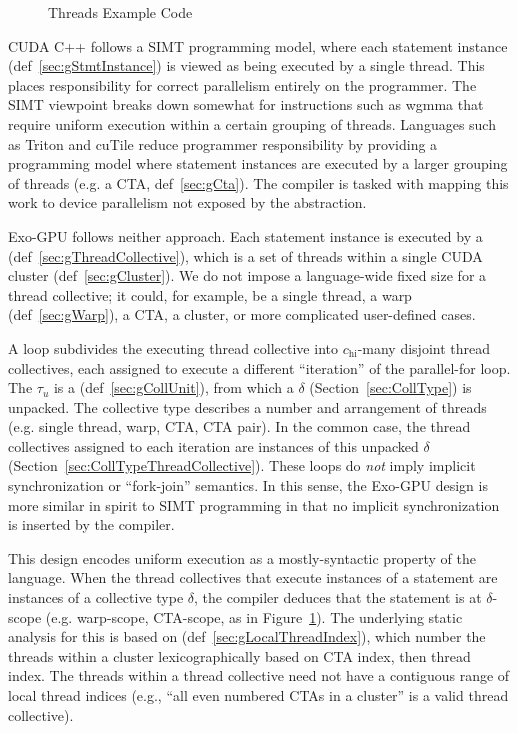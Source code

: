
\begin{figure}[b!]
\codehrule

\caption{Threads Example Code}
\label{fig:OverviewThreads}
\codehrule
\end{figure}

CUDA C++ follows a SIMT programming model, where each statement instance (def~\ref{sec:gStmtInstance}) is viewed as being executed by a single thread.
This places responsibility for correct parallelism entirely on the programmer.
The SIMT viewpoint breaks down somewhat for instructions such as wgmma that require uniform execution within a certain grouping of threads.
Languages such as Triton and cuTile reduce programmer responsibility by providing a programming model where statement instances are executed by a larger grouping of threads (e.g. a CTA, def~\ref{sec:gCta}).
The compiler is tasked with mapping this work to device parallelism not exposed by the abstraction.

Exo-GPU follows neither approach.
Each statement instance is executed by a  (def~\ref{sec:gThreadCollective}), which is a set of threads within a single CUDA cluster (def~\ref{sec:gCluster}).
We do not impose a language-wide fixed size for a thread collective; it could, for example, be a single thread, a warp (def~\ref{sec:gWarp}), a CTA, a cluster, or more complicated user-defined cases.

A  loop subdivides the executing thread collective into $c_\text{hi}$-many disjoint thread collectives, each assigned to execute a different ``iteration'' of the parallel-for loop.
The $\tau_u$ is a  (def~\ref{sec:gCollUnit}), from which a  $\delta$ (Section~\ref{sec:CollType}) is unpacked.
The collective type describes a number and arrangement of threads (e.g. single thread, warp, CTA, CTA pair).
In the common case, the thread collectives assigned to each iteration are instances of this unpacked $\delta$ (Section~\ref{sec:CollTypeThreadCollective}).
These loops do \emph{not} imply implicit synchronization or ``fork-join'' semantics.
In this sense, the Exo-GPU design is more similar in spirit to SIMT programming in that no implicit synchronization is inserted by the compiler.

This design encodes uniform execution as a mostly-syntactic property of the language.
When the thread collectives that execute instances of a statement are instances of a collective type $\delta$, the compiler deduces that the statement is at $\delta$-scope (e.g. warp-scope, CTA-scope, as in Figure~\ref{fig:OverviewThreads}).
The underlying static analysis for this is based on  (def~\ref{sec:gLocalThreadIndex}), which number the threads within a cluster lexicographically based on CTA index, then thread index.
The threads within a thread collective need not have a contiguous range of local thread indices (e.g., ``all even numbered CTAs in a cluster'' is a valid thread collective).


